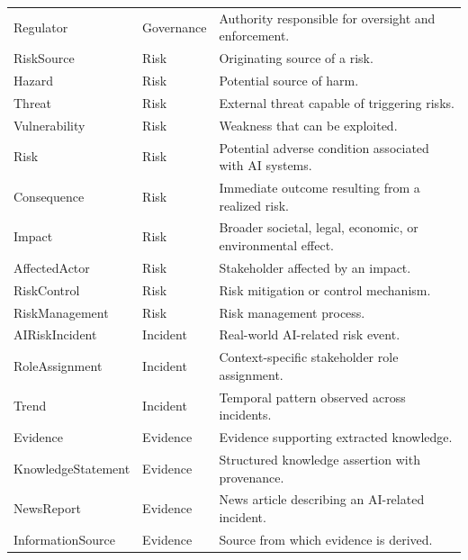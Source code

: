 \documentclass[a4paper,fleqn]{cas-dc}
\begin{document}
\begin{longtable}{>{\raggedright\arraybackslash}p{3.2cm}p{2.2cm}p{7.8cm}}
Regulator & Governance &
Authority responsible for oversight and enforcement. \\

RiskSource & Risk &
Originating source of a risk. \\

Hazard & Risk &
Potential source of harm. \\

Threat & Risk &
External threat capable of triggering risks. \\

Vulnerability & Risk &
Weakness that can be exploited. \\

Risk & Risk &
Potential adverse condition associated with AI systems. \\

Consequence & Risk &
Immediate outcome resulting from a realized risk. \\

Impact & Risk &
Broader societal, legal, economic, or environmental effect. \\

AffectedActor & Risk &
Stakeholder affected by an impact. \\

RiskControl & Risk &
Risk mitigation or control mechanism. \\

RiskManagement & Risk &
Risk management process. \\

AIRiskIncident & Incident &
Real-world AI-related risk event. \\

RoleAssignment & Incident &
Context-specific stakeholder role assignment. \\

Trend & Incident &
Temporal pattern observed across incidents. \\

Evidence & Evidence &
Evidence supporting extracted knowledge. \\

Knowledge\allowbreak Statement & Evidence &
Structured knowledge assertion with provenance. \\

NewsReport & Evidence &
News article describing an AI-related incident. \\

InformationSource & Evidence &
Source from which evidence is derived. \\


\end{longtable}
\end{document}
